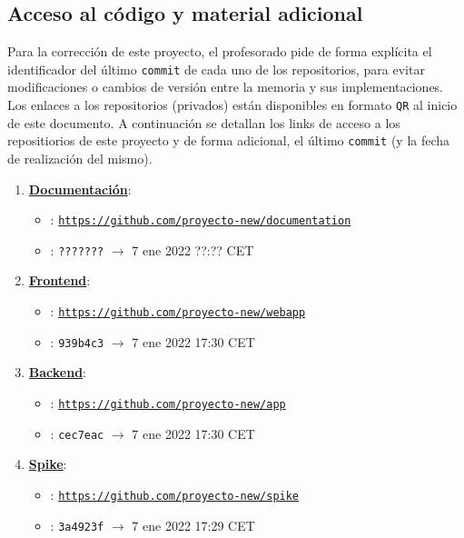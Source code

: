 \documentclass[../ei103948-project-documentation.tex]{subfiles}
\begin{document}
    \subsection{Acceso al código y material adicional}

    Para la corrección de este proyecto, el profesorado pide de forma explícita el identificador del último \texttt{commit} de cada uno de los repositorios, para evitar modificaciones o cambios de versión entre la memoria y sus implementaciones.\\

    Los enlaces a los repositorios (privados) están disponibles en formato \texttt{QR} al inicio de este documento. A continuación se detallan los links de acceso a los repositiorios de este proyecto y de forma adicional, el último \texttt{commit} (y la fecha  de realización del mismo).
        \begin{enumerate}
            \item \textbf{\underline{Documentación}}:
                \begin{itemize}
                    \item [\faIcon{code}] : \href{https://github.com/proyecto-new/documentation}{\texttt{https://github.com/proyecto-new/documentation}}
                    \item [\faIcon{calendar-check}] :  \texttt{???????} $\rightarrow$ 7 ene 2022 ??:?? CET

                \end{itemize}
            \item \textbf{\underline{Frontend}}: 
                \begin{itemize}
                \item [\faIcon{code}] : \href{https://github.com/proyecto-new/webapp}{\texttt{https://github.com/proyecto-new/webapp}}
                \item [\faIcon{calendar-check}] :  \texttt{939b4c3} $\rightarrow$ 7 ene 2022 17:30 CET
                \end{itemize}
            \item \textbf{\underline{Backend}}: 
                \begin{itemize}
                    \item [\faIcon{code}] : \href{https://github.com/proyecto-new/app}{\texttt{https://github.com/proyecto-new/app}}
                    \item [\faIcon{calendar-check}] : \texttt{cec7eac} $\rightarrow$ 7 ene 2022 17:30 CET
                \end{itemize}
            \item \textbf{\underline{Spike}}:
                \begin{itemize}
                    \item [\faIcon{code}] : \href{https://github.com/proyecto-new/spike}{\texttt{https://github.com/proyecto-new/spike}}
                    \item [\faIcon{calendar-check}] : \texttt{3a4923f} $\rightarrow$ 7 ene 2022 17:29 CET
                \end{itemize}
            
        \end{enumerate}
\end{document}
